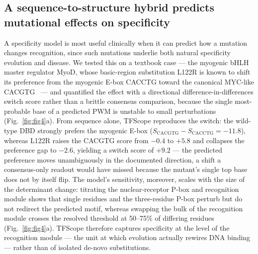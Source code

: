 \documentclass[11pt,letterpaper]{article}
\begin{document}
\subsection*{A sequence-to-structure hybrid predicts mutational effects on specificity}
A specificity model is most useful clinically when it can predict how a mutation changes
recognition, since such mutations underlie both natural specificity evolution and disease.
We tested this on a textbook case --- the myogenic bHLH master regulator MyoD, whose basic-region
substitution L122R is known to shift its preference from the myogenic E-box CACCTG toward the
canonical MYC-like CACGTG~\cite{Ma1994} --- and quantified the effect with a directional
difference-in-differences switch score rather than a brittle consensus comparison, because the
single most-probable base of a predicted PWM is unstable to small perturbations
(Fig.~\ref{fig:fig4}a). From sequence alone, TFScope reproduces the switch: the wild-type DBD
strongly prefers the myogenic E-box ($S_{\mathrm{CACGTG}}-S_{\mathrm{CACCTG}}=-11.8$), whereas
L122R raises the CACGTG score from $-0.4$ to $+5.8$ and collapses the preference gap to $-2.6$,
yielding a switch score of $+9.2$ --- the predicted preference moves unambiguously in the
documented direction, a shift a consensus-only readout would have missed because the mutant's
single top base does not by itself flip. The model's sensitivity, moreover, scales with the size
of the determinant change: titrating the nuclear-receptor P-box and recognition module shows that
single residues and the three-residue P-box perturb but do not redirect the predicted motif,
whereas swapping the bulk of the recognition module crosses the resolved threshold at 50--75\% of
differing residues (Fig.~\ref{fig:fig4}a). TFScope therefore captures specificity at the level of
the recognition module --- the unit at which evolution actually rewires DNA binding --- rather than
of isolated de-novo substitutions.
\end{document}
